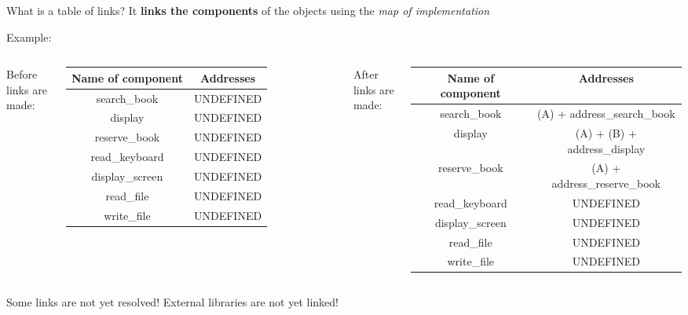 \documentclass{beamer}[10pt, usepdftitle=false, handout]
\begin{document}
	\begin{frame}

	\begin{block}{What is a table of links?}
	It \textbf{links the components} of the objects using the \textit{map of implementation}
	\end{block}	
	
	Example:	
	\vspace*{1em}
	
	\begin{columns}	
		
	Before links are made:
	\vspace*{1em}	
	
	\scalebox{0.5} {
	\begin{tabular}{|c|c|}
	\hline
	\textbf{Name of component} & \textbf{Addresses} \\ \hline
	search\_book & UNDEFINED \\ \hline
	display & UNDEFINED \\ \hline
	reserve\_book & UNDEFINED \\ \hline
	read\_keyboard & UNDEFINED \\ \hline
	display\_screen & UNDEFINED \\ \hline
	read\_file & UNDEFINED \\ \hline
	write\_file & UNDEFINED \\ \hline
	\end{tabular}
	}
		
	After links are made:
	\vspace*{1em}		
	
	\scalebox{0.5} {
	\begin{tabular}{|c|c|}
	\hline
	\textbf{Name of component} & \textbf{Addresses} \\ \hline
	search\_book & (A) + address\_search\_book \\ \hline
	display & (A) + (B) + address\_display \\ \hline
	reserve\_book & (A) + address\_reserve\_book \\ \hline
	read\_keyboard & UNDEFINED \\ \hline
	display\_screen & UNDEFINED \\ \hline
	read\_file & UNDEFINED \\ \hline
	write\_file & UNDEFINED \\ \hline
	\end{tabular}
	}
	\end{columns}
	
	\pause
	
	\vspace*{1em}	
	
	\begin{alertblock}{Some links are not yet resolved!}
	External libraries are not yet linked!
	\end{alertblock}
		
	\end{frame}
\end{document}
